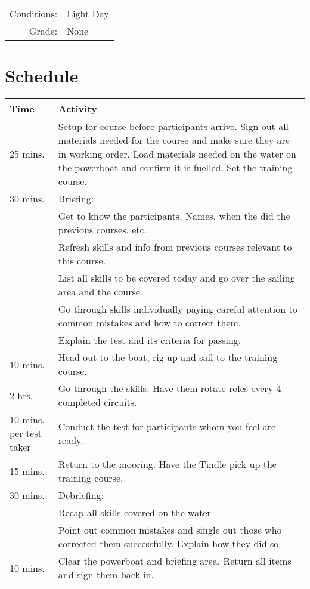 \documentclass[12pt]{scrartcl}
\begin{document}
\label{tab:requirements}
\begin{tabular}{rl}
	Conditions: & Light Day \\
	Grade: & None \\
\end{tabular}

\newpage

\section{Schedule} \label{sec:schedule}

\label{tab:schedule}
\begin{tabularx}{\textwidth}{|X|X|}
	\hline
	\textbf{Time} & \textbf{Activity} \\
	\hline
	25 mins. & Setup for course before participants arrive. Sign out all materials needed for the course and make sure they are in working order. Load materials needed on the water on the powerboat and confirm it is fuelled. Set the training course. \\
	\hline
	30 mins. & Briefing: \\
	& Get to know the participants. Names, when the did the previous courses, etc. \\
	& Refresh skills and info from previous courses relevant to this course. \\
	& List all skills to be covered today and go over the sailing area and the course. \\
	& Go through skills individually paying careful attention to common mistakes and how to correct them. \\
	& Explain the test and its criteria for passing. \\
	\hline
	10 mins. & Head out to the boat, rig up and sail to the training course. \\
	\hline
	2 hrs. & Go through the skills. Have them rotate roles every 4 completed circuits. \\
	\hline
	10 mins. per test taker & Conduct the test for participants whom you feel are ready. \\
	\hline
	15 mins. & Return to the mooring. Have the Tindle pick up the training course. \\
	\hline
	30 mins. & Debriefing: \\
	& Recap all skills covered on the water \\
	& Point out common mistakes and single out those who corrected them successfully. Explain how they did so. \\
	\hline
	10 mins. & Clear the powerboat and briefing area. Return all items and sign them back in. \\
	\hline
\end{tabularx}
\end{document}
